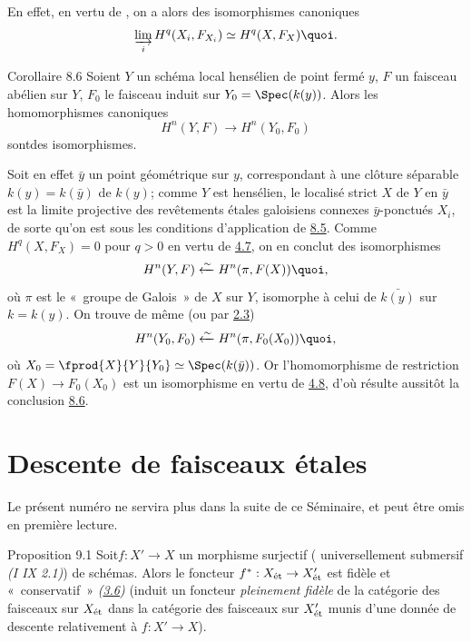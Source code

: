 \documentclass[10pt]{../fichiers-configuration-latex/smfart}
\begin{document}
En effet, en vertu de , on a alors des isomorphismes canoniques
$$
\varinjlim_{i} H^{q}(X_{i},F_{X_{i}})\simeq H^{q}(X,F_{X}){\quoi}.
$$

\begin{enonce*}{Corollaire 8.6}
Soient $Y$ un schéma local hensélien de point fermé $y$, $F$ un
faisceau abélien sur $Y$, $F_{0}$ le faisceau induit sur
$Y_{0}=\Spec (k(y))$. Alors les homomorphismes canoniques
$$
H^{n}(Y,F)\longrightarrow H^{n}(Y_{0},F_{0})
$$
sont\pageoriginale  des isomorphismes.
\end{enonce*}

Soit en effet $\bar{y}$ un point géométrique sur $y$, correspondant à
une clôture séparable $k(y)=k(\bar{y})$ de $k(y)$; comme $Y$ est
hensélien, le localisé strict $X$ de $Y$ en $\bar{y}$ est la limite
projective des revêtements étales galoisiens connexes
$\bar{y}$-ponctués $X_{i}$, de sorte qu'on est sous les conditions
d'application de \hyperref[VIII.cor8.5]{8.5}. Comme $H^{q}(X,F_{X})=0$ pour $q>0$ en vertu de
\hyperref[VIII.cor4.7]{4.7}, on en conclut des isomorphismes
$$
H^{n}(Y,F)\xleftarrow{\sim} H^{n}(\pi, F(X)){\quoi},
$$
où $\pi$ est le « groupe de Galois » de $X$ sur $Y$, isomorphe à
celui de $\bar{k(y)}$ sur $k=k(y)$. On trouve de même (ou par \hyperref[VIII.cor2.3]{2.3})
$$
H^{n}(Y_{0},F_{0})\xleftarrow{\sim} H^{n}(\pi,F_{0}(X_{0})){\quoi},
$$
où $X_{0}=\fprod{X}{Y}{Y_{0}}\simeq \Spec (k(\bar{y}))$. Or
l'homomorphisme de restriction $F(X)\rightarrow F_{0}(X_{0})$ est un
isomorphisme en vertu de \hyperref[VIII.cor4.8]{4.8}, d'où résulte aussitôt la conclusion \hyperref[VIII.cor8.6]{8.6}.

\section{Descente de faisceaux étales}

Le présent numéro ne servira plus dans la suite de ce Séminaire, et
peut être omis en première lecture.

\begin{enonce*}{Proposition 9.1}
Soit\pageoriginale  $f:X'\rightarrow X$ un morphisme surjectif (\resp
universellement submersif \emph{(\SGA I IX 2.1)}) de schémas. Alors le
foncteur $f^{\ast}:X_{\text{\rm ét}}\rightarrow X'_{\text{\rm ét}}$
est fidèle et « conservatif » \emph{(\cf \hyperref[VIII.cor3.6]{3.6})}
(\resp induit un
foncteur \emph{pleinement fidèle} de la catégorie des faisceaux sur
$X_{\text{\rm ét}}$ dans la catégorie des faisceaux sur $X'_{\text{\rm
    ét}}$ munis d'une donnée de descente relativement à
$f:X'\rightarrow X$).
\end{enonce*}
\end{document}
